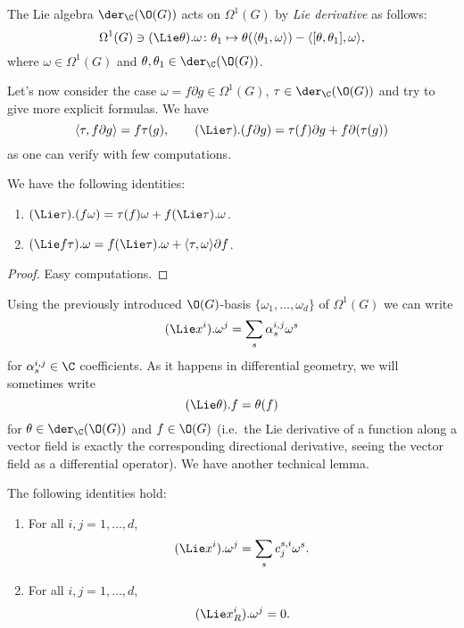 \documentclass[a4paper, 10pt]{article}
\begin{document}
            \begin{defn}
                The Lie algebra $\der_{\C}(\O(G))$ acts on $\Omega^1(G)$ by \emph{Lie derivative} as follows: \[\Omega^1(G) \ni (\Lie \theta).\omega\colon \theta_1 \mapsto \theta(\langle \theta_1, \omega \rangle) - \langle [\theta, \theta_1], \omega \rangle, \] where $\omega \in \Omega^1(G)$ and $\theta, \theta_1 \in \der_{\C}(\O(G))$.
            \end{defn}

            Let's now consider the case $\omega = f\partial g \in \Omega^1(G)$, $\tau \in \der_{\C}(\O(G))$ and try to give more explicit formulas. We have \[ \langle \tau, f\partial g \rangle = f\tau(g), \qquad (\Lie \tau).(f\partial g) = \tau(f)\partial g + f \partial(\tau(g))\] as one can verify with few computations.
            \begin{prop}
                \label{prop:lie_derivative}
                We have the following identities:
                \begin{enumerate}[label=(\arabic*)]
                    \item $(\Lie \tau).(f\omega) = \tau(f)\omega + f(\Lie \tau).\omega$.
                    \item $(\Lie f\tau).\omega = f(\Lie \tau).\omega + \langle \tau, \omega \rangle \partial f$.
                \end{enumerate}
            \end{prop}
            \begin{proof}
                Easy computations.
            \end{proof}
            Using the previously introduced $\O(G)$-basis $\{\omega_1, \dots, \omega_d\}$ of $\Omega^1(G)$ we can write \[(\Lie x^i).\omega^j = \sum_s \alpha^{i,j}_s\omega^s \] for $\alpha^{i,j}_s \in \C$ coefficients. As it happens in differential geometry, we will sometimes write \[(\Lie \theta).f = \theta(f) \] for $\theta \in \der_{\C}(\O(G))$ and $f \in \O(G)$ (i.e.\ the Lie derivative of a function along a vector field is exactly the corresponding directional derivative, seeing the vector field as a differential operator).
            We have another technical lemma.
            \begin{lemma}
                \label{lemma:B3}
                The following identities hold:
                \begin{enumerate}[label=(\roman*)]
                    \item For all $i, j = 1, \dots, d$,
                    \[(\Lie x^i).\omega^j = \sum_s c^{s,i}_j \omega^s. \]
                    \item For all $i, j = 1, \dots, d$,
                    \[(\Lie x^i_R).\omega^j = 0. \]
                \end{enumerate}
            \end{lemma}
\end{document}
